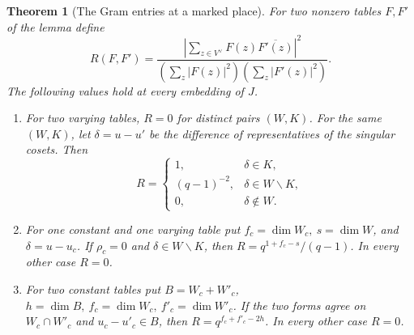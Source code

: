 \documentclass[a4paper,11pt]{article}
\newtheorem{theorem}[proposition]{Theorem}
\theoremstyle{definition}
\theoremstyle{remark}
\numberwithin{equation}{section}
\begin{document}
\begin{theorem}[The Gram entries at a marked place]
\label{thm:markedtablegram387}
For two nonzero tables \(F,F'\) of the lemma define
\[
   R(F,F')=\frac{|\sum_{z\in V^\vee}F(z)\overline{F'(z)}|^2}
                    {(\sum_z|F(z)|^2)(\sum_z|F'(z)|^2)} .
\]
The following values hold at every embedding of \(J\).
\begin{enumerate}
\item For two varying tables, \(R=0\) for distinct pairs \((W,K)\).
For the same \((W,K)\), let \(\delta=u-u'\) be the difference of
representatives of the singular cosets. Then
\[
  R=
  \begin{cases}
    1,&\delta\in K,\\
    (q-1)^{-2},&\delta\in W\smallsetminus K,\\
    0,&\delta\notin W.
  \end{cases}
\]
\item For one constant and one varying table put
\(f_c=\dim W_c,\ s=\dim W\), and \(\delta=u-u_c\).
If \(\rho_c=0\) and \(\delta\in W\smallsetminus K\), then
\(R=q^{1+f_c-s}/(q-1)\). In every other case \(R=0\).
\item For two constant tables put \(B=W_c+W'_c\),
\(h=\dim B,\ f_c=\dim W_c,\ f'_c=\dim W'_c\).
If the two forms agree on \(W_c\cap W'_c\) and
\(u_c-u'_c\in B\), then \(R=q^{f_c+f'_c-2h}\).
In every other case \(R=0\).
\end{enumerate}
\end{theorem}
\end{document}
